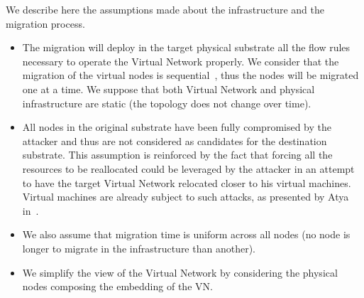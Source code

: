 \label{sec:mdp-system-hypotheses}
We describe here the assumptions made about the infrastructure and the migration process.

\begin{itemize}
    \item
    The migration will deploy in the target physical substrate all the flow rules necessary to operate the Virtual Network properly. We consider that the migration of the virtual nodes is sequential~\cite{Lime-Ghorbani2014}, thus the nodes will be migrated one at a time.
    We suppose that both Virtual Network and physical infrastructure are static (\ie the topology does not change over time).
    
    \item All nodes in the original substrate have been fully compromised by the attacker and thus are not considered as candidates for the destination substrate.  
    This assumption is reinforced by the fact that forcing all the resources to be reallocated could be leveraged by the attacker in an attempt to have the target Virtual Network relocated closer to his virtual machines.
    Virtual machines are already subject to such attacks, as presented by Atya \etal in~\cite{stalling-atya2017,malicious-atya2017}.

    \item
    We also assume that migration time is uniform across all nodes (\ie no node is longer to migrate in the infrastructure than another).
    
    \item
     We simplify the view of the Virtual Network by considering the physical nodes composing the embedding of the VN.
\end{itemize}

